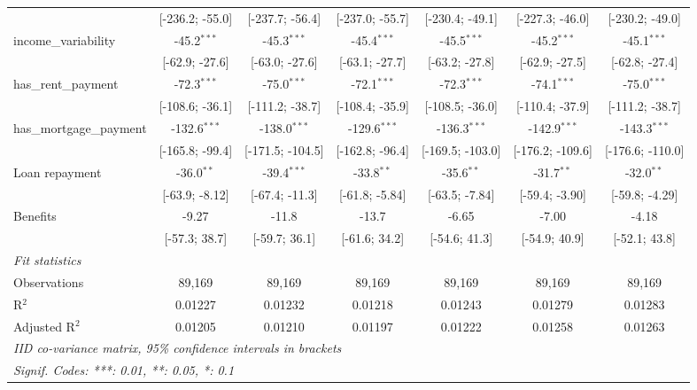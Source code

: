 \begin{table}[htbp]
\begin{threeparttable}[b]
\begin{tabular}{lcccccc}
                                   & [-236.2; -55.0]  & [-237.7; -56.4]  & [-237.0; -55.7]  & [-230.4; -49.1]  & [-227.3; -46.0]  & [-230.2; -49.0]\\   
         income\_variability       & -45.2$^{***}$    & -45.3$^{***}$    & -45.4$^{***}$    & -45.5$^{***}$    & -45.2$^{***}$    & -45.1$^{***}$\\   
                                   & [-62.9; -27.6]   & [-63.0; -27.6]   & [-63.1; -27.7]   & [-63.2; -27.8]   & [-62.9; -27.5]   & [-62.8; -27.4]\\   
         has\_rent\_payment        & -72.3$^{***}$    & -75.0$^{***}$    & -72.1$^{***}$    & -72.3$^{***}$    & -74.1$^{***}$    & -75.0$^{***}$\\   
                                   & [-108.6; -36.1]  & [-111.2; -38.7]  & [-108.4; -35.9]  & [-108.5; -36.0]  & [-110.4; -37.9]  & [-111.2; -38.7]\\   
         has\_mortgage\_payment    & -132.6$^{***}$   & -138.0$^{***}$   & -129.6$^{***}$   & -136.3$^{***}$   & -142.9$^{***}$   & -143.3$^{***}$\\   
                                   & [-165.8; -99.4]  & [-171.5; -104.5] & [-162.8; -96.4]  & [-169.5; -103.0] & [-176.2; -109.6] & [-176.6; -110.0]\\   
         Loan repayment            & -36.0$^{**}$     & -39.4$^{***}$    & -33.8$^{**}$     & -35.6$^{**}$     & -31.7$^{**}$     & -32.0$^{**}$\\   
                                   & [-63.9; -8.12]   & [-67.4; -11.3]   & [-61.8; -5.84]   & [-63.5; -7.84]   & [-59.4; -3.90]   & [-59.8; -4.29]\\   
         Benefits                  & -9.27            & -11.8            & -13.7            & -6.65            & -7.00            & -4.18\\   
                                   & [-57.3; 38.7]    & [-59.7; 36.1]    & [-61.6; 34.2]    & [-54.6; 41.3]    & [-54.9; 40.9]    & [-52.1; 43.8]\\   
         \midrule
         \emph{Fit statistics}\\
         Observations              & 89,169           & 89,169           & 89,169           & 89,169           & 89,169           & 89,169\\  
         R$^2$                     & 0.01227          & 0.01232          & 0.01218          & 0.01243          & 0.01279          & 0.01283\\  
         Adjusted R$^2$            & 0.01205          & 0.01210          & 0.01197          & 0.01222          & 0.01258          & 0.01263\\  
         \midrule \midrule
         \multicolumn{7}{l}{\emph{IID co-variance matrix, 95\% confidence intervals in brackets}}\\
         \multicolumn{7}{l}{\emph{Signif. Codes: ***: 0.01, **: 0.05, *: 0.1}}\\
      \end{tabular}
      

\end{threeparttable}
\end{table}
